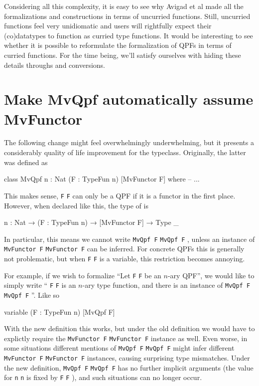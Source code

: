 \documentclass[titlepage]{report}
\newcommand\lean[1]{%
\ifx\leanmode\undefined%
\def\leanmode{1}%
\texttt{\small #1}%
\undef\leanmode%
\else%
\texttt{#1}%
\fi%
}
\begin{document}
Considering all this complexity, it is easy to see why Avigad et al made all the formalizations and
constructions in terms of uncurried functions. 
Still, uncurried functions feel very unidiomatic and users will rightfully expect their (co)datatypes
to function as curried type functions. 
It would be interesting to see whether it is possible to reformulate the formalization of QPFs in
terms of curried functions. 
For the time being, we'll satisfy ourselves with hiding these details throughs
 and  conversions.



\section{Make MvQpf automatically assume MvFunctor}
The following change might feel overwhelmingly underwhelming, but it presents a considerably quality 
of life improvement for the  typeclass. Originally, the latter was defined as
\begin{leancode}
    class MvQpf {n : Nat} (F : TypeFun n) [MvFunctor F] where
        -- ...
\end{leancode}
This makes sense, \lean{F} can only be a QPF if it is a functor in the first place.
However, when declared like this, the type of  is 

\begin{leancode}
    {n : Nat} → (F : TypeFun n) → [MvFunctor F] → Type _
\end{leancode}
In particular, this means we cannot write \lean{MvQpf F}, unless an instance of \lean{MvFunctor F} can be inferred. For concrete QPFs this is generally not problematic, but when \lean{F} is a variable, this restriction becomes annoying. 

For example, if we wish to formalize ``Let \lean{F} be an $n$-ary QPF'', we would like to simply write ``\lean{F} is an $n$-ary type function, and there is an instance of \lean{MvQpf F}''. Like so
\begin{leancode}
    variable (F : TypeFun n) [MvQpf F]
\end{leancode}

With the new definition this works, but under the old definition we would have to explictly require the \lean{MvFunctor F} instance as well. 
Even worse, in some situations different mentions of \lean{MvQpf F} might infer different \lean{MvFunctor F} instances, causing surprising type mismatches. Under the new definition, \lean{MvQpf F} has no further implicit arguments (the value for \lean{n} is fixed by \lean{F}), and such situations can no longer occur.
\end{document}
